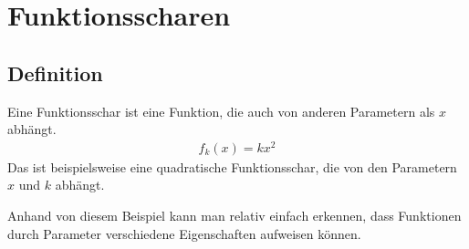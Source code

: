 \chapter{Funktionsscharen}

\section{Definition}
\begin{flushleft}
    Eine Funktionsschar ist eine Funktion, die auch von anderen Parametern als \(x\) abhängt.
    \begin{align}
        f_k(x)=kx^2
    \end{align}
    Das ist beispielsweise eine quadratische Funktionsschar, die von den Parametern \(x\) und \(k\) abhängt.
\end{flushleft}

\begin{center}
\end{center}

\begin{flushleft}
    Anhand von diesem Beispiel kann man relativ einfach erkennen, dass Funktionen durch Parameter verschiedene Eigenschaften aufweisen können.
\end{flushleft}
